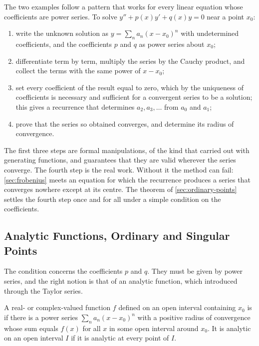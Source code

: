 The two examples follow a pattern that works for every linear equation whose coefficients are power series. To solve $y''+p(x)y'+q(x)y=0$ near a point $x_0$:
\begin{enumerate}
\item write the unknown solution as $y=\sum_na_n(x-x_0)^n$ with undetermined coefficients, and the coefficients $p$ and $q$ as power series about $x_0$;
\item differentiate term by term, multiply the series by the Cauchy product, and collect the terms with the same power of $x-x_0$;
\item set every coefficient of the result equal to zero, which by the uniqueness of coefficients is necessary and sufficient for a convergent series to be a solution; this gives a recurrence that determines $a_2,a_3,\ldots$ from $a_0$ and $a_1$;
\item prove that the series so obtained converges, and determine its radius of convergence.
\end{enumerate}
The first three steps are formal manipulations, of the kind that  carried out with generating functions, and  guarantees that they are valid wherever the series converge. The fourth step is the real work. Without it the method can fail: \cref{sec:frobenius} meets an equation for which the recurrence produces a series that converges nowhere except at its centre. The theorem of \cref{sec:ordinary-points} settles the fourth step once and for all under a simple condition on the coefficients.

\subsection{Analytic Functions, Ordinary and Singular Points}

The condition concerns the coefficients $p$ and $q$. They must be given by power series, and the right notion is that of an analytic function, which  introduced through the Taylor series.

\begin{definition}
\label{def:analytic}
A real- or complex-valued function $f$ defined on an open interval containing $x_0$ is  if there is a power series $\sum_na_n(x-x_0)^n$ with a positive radius of convergence whose sum equals $f(x)$ for all $x$ in some open interval around $x_0$. It is analytic on an open interval $I$ if it is analytic at every point of $I$.
\end{definition}

